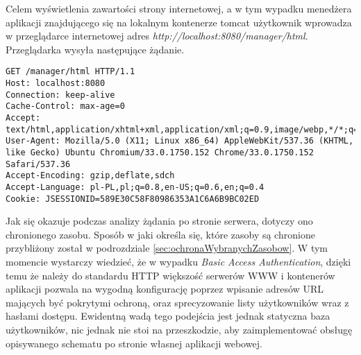 \documentclass[11pt]{aghdpl}
\begin{document}

Celem wyświetlenia zawartości strony internetowej, a w tym wypadku menedżera aplikacji znajdującego się na lokalnym kontenerze tomcat użytkownik wprowadza w przeglądarce internetowej adres \emph{http://localhost:8080/manager/html}. Przeglądarka wysyła następujące żądanie.
\begin{lstlisting}
GET /manager/html HTTP/1.1
Host: localhost:8080
Connection: keep-alive
Cache-Control: max-age=0
Accept: text/html,application/xhtml+xml,application/xml;q=0.9,image/webp,*/*;q=0.8
User-Agent: Mozilla/5.0 (X11; Linux x86_64) AppleWebKit/537.36 (KHTML, like Gecko) Ubuntu Chromium/33.0.1750.152 Chrome/33.0.1750.152 Safari/537.36
Accept-Encoding: gzip,deflate,sdch
Accept-Language: pl-PL,pl;q=0.8,en-US;q=0.6,en;q=0.4
Cookie: JSESSIONID=589E30C58F80986353A1C6A6B9BC02ED
\end{lstlisting}

Jak się okazuje podczas analizy żądania po stronie serwera, dotyczy ono chronionego zasobu. Sposób w jaki określa się, które zasoby są chronione przybliżony został w podrozdziale \ref{sec:ochronaWybranychZasobow}. W tym momencie wystarczy wiedzieć, że w wypadku \emph{Basic Access Authentication}, dzięki temu że należy do standardu HTTP większość serwerów WWW i kontenerów aplikacji pozwala na wygodną konfigurację poprzez wpisanie adresów URL mających być pokrytymi ochroną, oraz sprecyzowanie listy użytkowników wraz z hasłami dostępu. Ewidentną wadą tego podejścia jest jednak statyczna baza użytkowników, nic jednak nie stoi na przeszkodzie, aby zaimplementować obsługę opisywanego schematu po stronie własnej aplikacji webowej.
\end{document}
